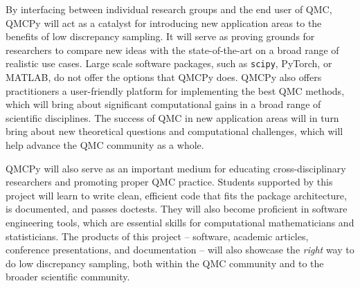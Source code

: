\documentclass[11pt]{article}%
\begin{document}


By interfacing between individual research groups and the end user of QMC, QMCPy will act as a catalyst for introducing new application areas to the benefits of low discrepancy sampling. It will serve as proving grounds for researchers to compare new ideas with the state-of-the-art on a broad range of realistic use cases. Large scale software packages, such as \texttt{scipy}, PyTorch, or MATLAB, do not offer the options that QMCPy does. QMCPy also offers practitioners a user-friendly platform for implementing the best QMC methods, which will bring about significant computational gains in a broad range of scientific disciplines. The success of QMC in new application areas will in turn bring about new theoretical questions and computational challenges, which will help advance the QMC community as a whole.

QMCPy will also serve as an important medium for educating cross-disciplinary researchers and promoting proper QMC practice. Students supported by this project will learn to write clean, efficient code that fits the package architecture, is documented, and passes doctests. They will also become proficient in software engineering tools, which are essential skills for computational mathematicians and statisticians. The products of this project -- software, academic articles, conference presentations, and documentation -- will also showcase the \textit{right} way to do low discrepancy sampling, both within the QMC community and to the broader scientific community.
\end{document}
